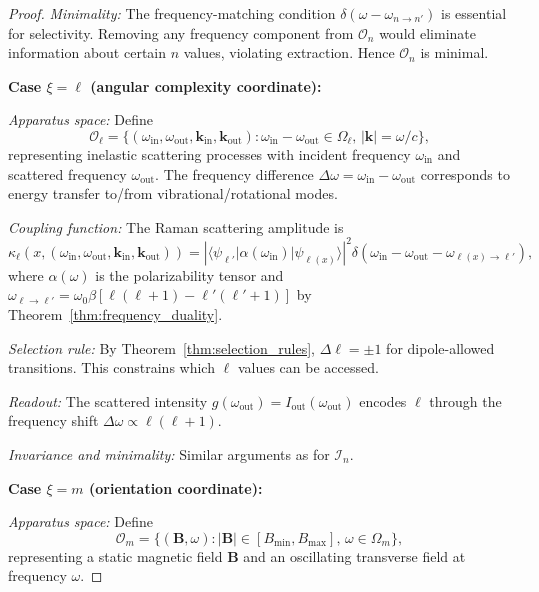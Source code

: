 \documentclass[twocolumn,10pt,a4paper]{article}
\theoremstyle{remark}
\newcommand{\oscillator}{\mathcal{O}}
\begin{document}
\begin{proof}
\emph{Minimality:} The frequency-matching condition $\delta(\omega - \omega_{n \to n'})$ is essential for selectivity. Removing any frequency component from $\oscillator_n$ would eliminate information about certain $n$ values, violating extraction. Hence $\oscillator_n$ is minimal.

\textbf{Case $\xi = \ell$ (angular complexity coordinate):}

\emph{Apparatus space:} Define
\begin{equation}
\oscillator_\ell = \{(\omega_{\text{in}}, \omega_{\text{out}}, \mathbf{k}_{\text{in}}, \mathbf{k}_{\text{out}}) : \omega_{\text{in}} - \omega_{\text{out}} \in \Omega_\ell, \, |\mathbf{k}| = \omega/c\},
\end{equation}
representing inelastic scattering processes with incident frequency $\omega_{\text{in}}$ and scattered frequency $\omega_{\text{out}}$. The frequency difference $\Delta\omega = \omega_{\text{in}} - \omega_{\text{out}}$ corresponds to energy transfer to/from vibrational/rotational modes.

\emph{Coupling function:} The Raman scattering amplitude is
\begin{equation}
\kappa_\ell(x, (\omega_{\text{in}}, \omega_{\text{out}}, \mathbf{k}_{\text{in}}, \mathbf{k}_{\text{out}})) = \left|\langle \psi_{\ell'} | \alpha(\omega_{\text{in}}) | \psi_{\ell(x)} \rangle\right|^2 \delta(\omega_{\text{in}} - \omega_{\text{out}} - \omega_{\ell(x) \to \ell'}),
\end{equation}
where $\alpha(\omega)$ is the polarizability tensor and $\omega_{\ell \to \ell'} = \omega_0 \beta [\ell(\ell+1) - \ell'(\ell'+1)]$ by Theorem~\ref{thm:frequency_duality}.

\emph{Selection rule:} By Theorem~\ref{thm:selection_rules}, $\Delta \ell = \pm 1$ for dipole-allowed transitions. This constrains which $\ell$ values can be accessed.

\emph{Readout:} The scattered intensity $g(\omega_{\text{out}}) = I_{\text{out}}(\omega_{\text{out}})$ encodes $\ell$ through the frequency shift $\Delta\omega \propto \ell(\ell+1)$.

\emph{Invariance and minimality:} Similar arguments as for $\mathcal{I}_n$.

\textbf{Case $\xi = m$ (orientation coordinate):}

\emph{Apparatus space:} Define
\begin{equation}
\oscillator_m = \{(\mathbf{B}, \omega) : |\mathbf{B}| \in [B_{\min}, B_{\max}], \, \omega \in \Omega_m\},
\end{equation}
representing a static magnetic field $\mathbf{B}$ and an oscillating transverse field at frequency $\omega$.


\end{proof}
\end{document}

